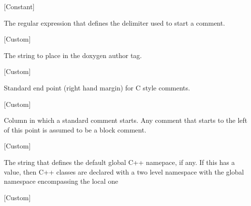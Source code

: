 \vspace{1em}
\noindent
{}
\usebox{\funcname}
 \hfill [Constant]

\begin{doc-string}
The regular expression that defines the delimiter used to start
a comment.
\end{doc-string}

\vspace{1em}
\noindent
{}
\usebox{\funcname}
 \hfill [Custom]

\begin{doc-string}
The string to place in the doxygen author tag.
\end{doc-string}

\vspace{1em}
\noindent
{}
\usebox{\funcname}
 \hfill [Custom]

\begin{doc-string}
Standard end point (right hand margin) for C style comments.
\end{doc-string}

\vspace{1em}
\noindent
{}
\usebox{\funcname}
 \hfill [Custom]

\begin{doc-string}
Column in which a standard comment starts.  Any comment that starts to the left of
this point is assumed to be a block comment.
\end{doc-string}

\vspace{1em}
\noindent
{}
\usebox{\funcname}
 \hfill [Custom]

\begin{doc-string}
The string that defines the default global C++ namepace, if any.
If this has a value, then C++ classes are declared with a two level
namespace with the global namespace encompassing the local one
\end{doc-string}

\vspace{1em}
\noindent
{}
\usebox{\funcname}
 \hfill [Custom]

